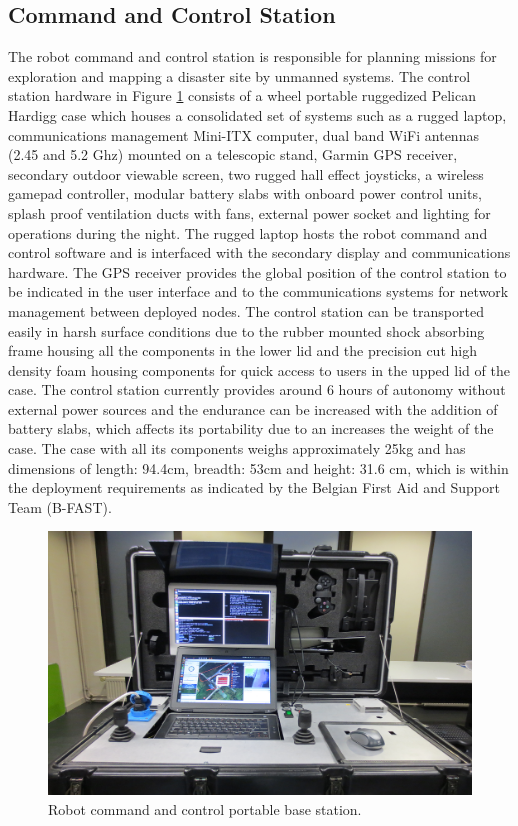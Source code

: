 \documentclass{article}
\begin{document}
\subsection{Command and Control Station} \label{command_and_control}
The robot command and control station is responsible for planning missions for exploration and mapping a disaster site by unmanned systems.
The control station hardware in Figure \ref{fig:RC2_BOX} consists of a wheel portable ruggedized Pelican Hardigg case which houses a consolidated set of systems such as a rugged laptop, communications management Mini-ITX computer, dual band WiFi antennas (2.45 and 5.2 Ghz) mounted on a telescopic stand, Garmin GPS receiver, secondary outdoor viewable screen, two rugged hall effect joysticks, a wireless gamepad controller, modular battery slabs with onboard power control units, splash proof ventilation ducts with fans, external power socket and lighting for operations during the night.
The rugged laptop hosts the robot command and control software and is interfaced with the secondary display and communications hardware.
The GPS receiver provides the global position of the control station to be indicated in the user interface and to the communications systems for network management between deployed nodes.
The control station can be transported easily in harsh surface conditions due to the rubber mounted shock absorbing frame housing all the components in the lower lid and the precision cut high density foam housing components for quick access to users in the upped lid of the case.
The control station currently provides around 6 hours of autonomy without external power sources and the endurance can be increased with the addition of battery slabs, which affects its portability due to an increases the weight of the case.
The case with all its components weighs approximately 25kg and has dimensions of length: 94.4cm,  breadth: 53cm and height: 31.6 cm, which is within the deployment requirements as indicated by the Belgian First Aid and Support Team (B-FAST).
\begin{figure}
    \centering
    \includegraphics[width=\textwidth]{ROB-15-0035_fig19.png}
    \caption{Robot command and control portable base station.}
    \label{fig:RC2_BOX}
\end{figure}
\end{document}
